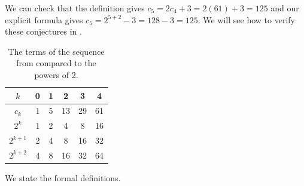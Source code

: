 \begin{exam}
\begin{actpart}
\begin{soln}
                We can check that the definition gives $c_5=2c_4+3=2(61)+3 = 125$ and our explicit formula gives $c_5=2^{5+2}-3 = 128-3 = 125$. We will see how to verify these conjectures in .
                \begin{table}[hbtp]
                        \centering
                        \begin{tabular}{c|c |c|c |c|c}
                            $k$ & 0 & 1 & 2 & 3 & 4  \\ \hline
                            $c_k$ & 1 & 5 & 13 & 29 & 61 \\ \hline
                            $2^k$ & 1 & 2 & 4 & 8 & 16  \\ \hline
                            $2^{k+1}$ & 2 & 4 & 8 & 16 & 32 \\ \hline
                            $2^{k+2}$ & 4 & 8 & 16 & 32 & 64 \\
                        \end{tabular}
                        \caption{The terms of the sequence from  compared to the powers of 2.}              \label{table_exam_double_and_add3}
                    \end{table}
            \end{soln}
        \end{actpart}
\end{exam}

We state the formal definitions.


